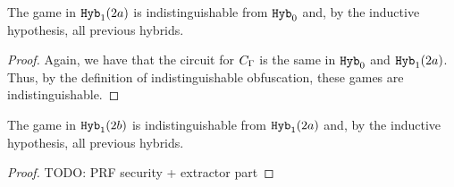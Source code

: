 	\begin{lemma}
		The game in $\texttt{Hyb}_1 (2a)$ is indistinguishable from $\texttt{Hyb}_0$ and, by the inductive hypothesis, all previous hybrids.
		\begin{proof}
			Again, we have that the circuit for $C_\Gamma$ is the same in $\texttt{Hyb}_0$ and $\texttt{Hyb}_1 (2a)$.
			Thus, by the definition of indistinguishable obfuscation, these games are indistinguishable.
		\end{proof}
	\end{lemma}

	\begin{lemma}
		The game in $\texttt{Hyb}_1 (2b)$ is indistinguishable from $\texttt{Hyb}_1 (2a)$ and, by the inductive hypothesis, all previous hybrids.
		\begin{proof}
			TODO: PRF security + extractor part
		\end{proof}
	\end{lemma}

	